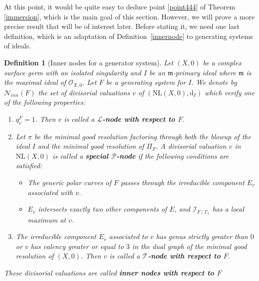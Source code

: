 \documentclass[reqno,dvipsnames,12pt]{amsart}
\newtheorem{defi}[thm]{Definition}
\begin{document}
At this point, it would be quite easy to deduce point \ref{point444} of Theorem \ref{immersion}, which is the main goal of this section. However, we will prove a more precise result that will be of interest later. Before stating it, we need one last definition, which is an adaptation of Definition~\ref{innernode} to generating systems of ideals.


\begin{defi}[Inner nodes for a generator system]\label{innernodeI}
Let $(X,0)$ be a complex surface germ with an isolated singularity and $I$ be an $\mathfrak{m}$-primary ideal where $\mathfrak{m}$ is the maximal ideal of $\mathcal{O}_{X,0}$. Let $F$ be a generating system for $I$. We denote by $\mathcal{N}_{inn}(F)$ the set of divisorial valuations $v$ of $(\mathrm{NL}(X,0),\mathrm{d}_I)$    which verify one of the following properties:
	
	\begin{enumerate}
		\item $q_v^{F}=1$. Then $v$ is called a \textbf{$\mathcal{L}$-node with respect to $F$}.
		 \item Let $\pi$ be the minimal good resolution factoring through both the blowup of the  ideal $I$ and the minimal good resolution of $\Pi_F$. A divisorial valuation   $v$ in $\mathrm{NL}(X,0)$ is called a \textbf{special $\mathcal{P}$-node} if the following conditions are satisfied:
    \begin{itemize}
        \item The generic polar curves of $F$ passes through the irreducible component $E_v$ associated with $v$.
        \item $E_v$ intersects exactly two other components of $E$, and $\mathcal{I}_{F\mid \Gamma_{\pi}}$ has a local maximum at $v$.
    \end{itemize}
		\item The irreducible component $E_v$ associated to $v$  has genus strictly greater than $0$ or $v$ has valency  greater or equal to $3$ in the dual graph of the minimal good resolution of $(X,0)$. Then $v$ is called a \textbf{$\mathcal{T}$-node with respect to $F$}.
		\end{enumerate}
 These divisorial valuations are called \textbf{inner nodes with respect to $F$}
        
\end{defi} 
\end{document}
